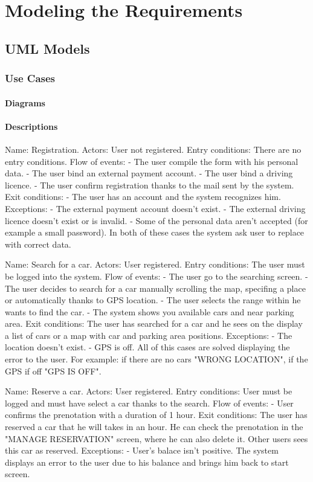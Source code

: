 \documentclass[11pt,a4paper]{report}
\begin{document}
\chapter{Modeling the Requirements}

\section{UML Models}

\subsection{Use Cases}
\subsubsection{Diagrams}
\subsubsection{Descriptions}
Name: Registration.
Actors: User not registered.
Entry conditions: There are no entry conditions.
Flow of events:
- The user compile the form with his personal data.
- The user bind an external payment account.
- The user bind a driving licence.
- The user confirm registration thanks to the mail sent by the system.
Exit conditions:
- The user has an account and the system recognizes him.
Exceptions:
- The external payment account doesn't exist.
- The external driving licence doesn't exist or is invalid.
- Some of the personal data aren't accepted (for example a small password).
In both of these cases the system ask user to replace with correct data.


Name: Search for a car.
Actors: User registered.
Entry conditions: The user must be logged into the system.
Flow of events:
- The user go to the searching screen.
- The user decides to search for a car manually scrolling the map, specifing a place or automatically thanks to GPS location.
- The user selects the range within he wants to find the car.
- The system shows you available cars and near parking area.
Exit conditions: The user has searched for a car and he sees on the display a list of cars or a map with car and parking area positions.
Exceptions:
- The location doesn't exist.
- GPS is off.
All of this cases are solved displaying the error to the user. 
For example: if there are no cars "WRONG LOCATION", if the GPS if off "GPS IS OFF".


Name: Reserve a car.
Actors: User registered.
Entry conditions: User must be logged and must have select a car thanks to the search.
Flow of events:
- User confirms the prenotation with a duration of 1 hour.
Exit conditions: The user has reserved a car that he will takes in an hour. He can check the prenotation in the "MANAGE RESERVATION" screen, where he can also delete it. Other users sees this car as reserved.
Exceptions:
- User's balace isn't positive.
The system displays an error to the user due to his balance and brings him back to start screen.
\end{document}

